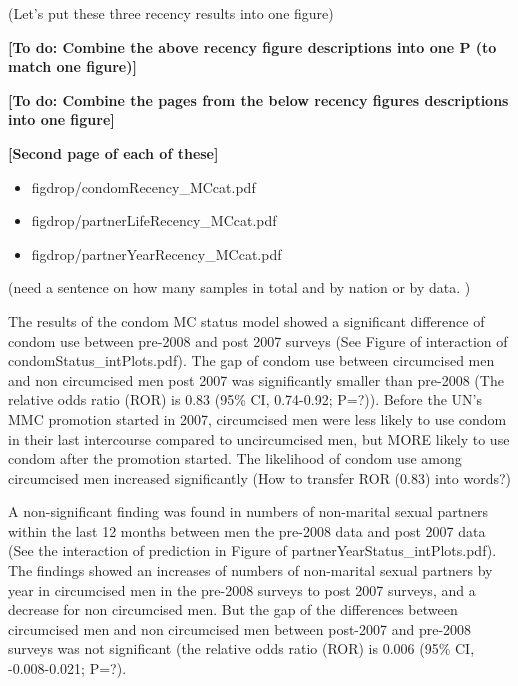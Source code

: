 \documentclass[12pt,]{article}
\providecommand{\tightlist}{%
  \setlength{\itemsep}{0pt}\setlength{\parskip}{0pt}}
\begin{document}
(Let's put these three recency results into one figure)

\textbf{{[}To do: Combine the above recency figure descriptions into one
P (to match one figure){]}}

\textbf{{[}To do: Combine the pages from the below recency figures
descriptions into one figure{]}}

\textbf{{[}Second page of each of these{]}}

\begin{itemize}
\tightlist
\item
  figdrop/condomRecency\_MCcat.pdf
\item
  figdrop/partnerLifeRecency\_MCcat.pdf
\item
  figdrop/partnerYearRecency\_MCcat.pdf
\end{itemize}

(need a sentence on how many samples in total and by nation or by data.
)

The results of the condom MC status model showed a significant
difference of condom use between pre-2008 and post 2007 surveys (See
Figure of interaction of condomStatus\_intPlots.pdf). The gap of condom
use between circumcised men and non circumcised men post 2007 was
significantly smaller than pre-2008 (The relative odds ratio (ROR) is
0.83 (95\% CI, 0.74-0.92; P=?)). Before the UN's MMC promotion started
in 2007, circumcised men were less likely to use condom in their last
intercourse compared to uncircumcised men, but MORE likely to use condom
after the promotion started. The likelihood of condom use among
circumcised men increased significantly (How to transfer ROR (0.83) into
words?)

A non-significant finding was found in numbers of non-marital sexual
partners within the last 12 months between men the pre-2008 data and
post 2007 data (See the interaction of prediction in Figure of
partnerYearStatus\_intPlots.pdf). The findings showed an increases of
numbers of non-marital sexual partners by year in circumcised men in the
pre-2008 surveys to post 2007 surveys, and a decrease for non
circumcised men. But the gap of the differences between circumcised men
and non circumcised men between post-2007 and pre-2008 surveys was not
significant (the relative odds ratio (ROR) is 0.006 (95\% CI,
-0.008-0.021; P=?).
\end{document}
